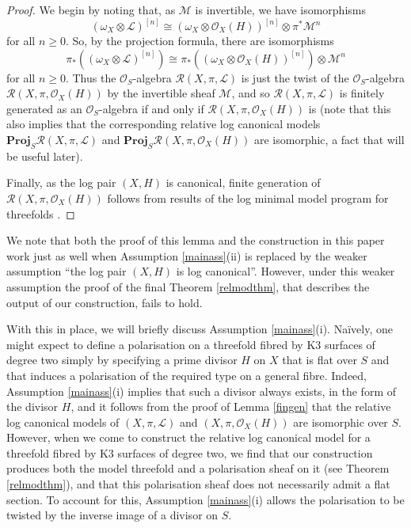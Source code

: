 \documentclass{amsart}
\begin{document}
\begin{proof} We begin by noting that, as ${\mathcal{M}}$ is invertible, we have isomorphisms 
\[(\omega_X \otimes {\mathcal{L}})^{[n]} \cong (\omega_X \otimes {\mathcal{O}}_X(H))^{[n]} \otimes \pi^*{\mathcal{M}}^n\]
for all $n \geq 0$. So, by the projection formula, there are isomorphisms 
\[\pi_*((\omega_X \otimes {\mathcal{L}})^{[n]}) \cong \pi_*((\omega_X \otimes {\mathcal{O}}_X(H))^{[n]})\otimes {\mathcal{M}}^n\] 
for all $n \geq 0$. Thus the ${\mathcal{O}}_S$-algebra ${\mathcal{R}}(X,\pi,{\mathcal{L}})$ is just the twist of the ${\mathcal{O}}_S$-algebra ${\mathcal{R}}(X,\pi,{\mathcal{O}}_X(H))$ by the invertible sheaf ${\mathcal{M}}$, and so ${\mathcal{R}}(X,\pi,{\mathcal{L}})$ is finitely generated as an ${\mathcal{O}}_S$-algebra if and only if ${\mathcal{R}}(X,\pi,{\mathcal{O}}_X(H))$ is (note that this also implies that the corresponding relative log canonical models $\mathbf{Proj}_S{\mathcal{R}}(X,\pi,{\mathcal{L}})$ and $\mathbf{Proj}_S{\mathcal{R}}(X,\pi,{\mathcal{O}}_X(H))$ are isomorphic, a fact that will be useful later).

Finally, as the log pair $(X,H)$ is canonical, finite generation of ${\mathcal{R}}(X,\pi,{\mathcal{O}}_X(H))$ follows from results of the log minimal model program for threefolds \cite[Theorem 3.14]{ilmmplcp}.\end{proof}

\begin{remark} We note that both the proof of this lemma and the construction in this paper work just as well when Assumption \ref{mainass}(ii) is replaced by the weaker assumption ``the log pair $(X,H)$ is log canonical''. However, under this weaker assumption the proof of the final Theorem \ref{relmodthm}, that describes the output of our construction, fails to hold.\end{remark}

With this in place, we will briefly discuss Assumption \ref{mainass}(i). Na\"{i}vely, one might expect to define a polarisation on a threefold fibred by K3 surfaces of degree two simply by specifying a prime divisor $H$ on $X$ that is flat over $S$ and that induces a polarisation of the required type on a general fibre. Indeed, Assumption \ref{mainass}(i) implies that such a divisor always exists, in the form of the divisor $H$, and it follows from the proof of Lemma \ref{fingen} that the relative log canonical models of $(X,\pi,{\mathcal{L}})$ and $(X,\pi,{\mathcal{O}}_X(H))$ are isomorphic over $S$. However, when we come to construct the relative log canonical model for a threefold fibred by K3 surfaces of degree two, we find that our construction produces both the model threefold and a polarisation sheaf on it (see Theorem \ref{relmodthm}), and that this polarisation sheaf does not necessarily admit a flat section. To account for this, Assumption \ref{mainass}(i) allows the polarisation to be twisted by the inverse image of a divisor on $S$.
\end{document}
